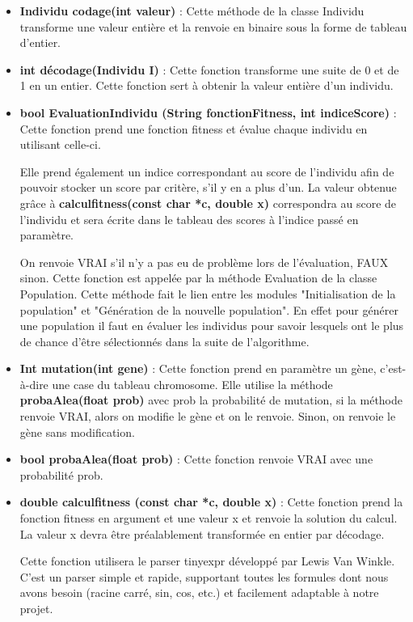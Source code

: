 \documentclass[a4paper,11pt]{article}
\begin{document}
				\begin{itemize}
							\item \textbf{Individu codage(int valeur)} : Cette méthode de la classe Individu transforme une valeur entière et la renvoie en binaire sous la forme de tableau d’entier.\vspace{0.2cm}
							\item \textbf{int décodage(Individu I)} : Cette fonction transforme une suite de 0 et de 1 en un entier. Cette fonction sert à obtenir la valeur entière d’un individu.\vspace{0.2cm}
							\item \textbf{bool EvaluationIndividu (String fonctionFitness, int indiceScore)} : Cette fonction prend une fonction fitness et évalue chaque individu en utilisant celle-ci. 

																									Elle prend également un indice correspondant  au score de l’individu afin de pouvoir stocker un score par critère, s'il y en a plus d'un. 
																									La valeur obtenue grâce à \textbf{calculfitness(const char *c, double x)} correspondra au score de l’individu et sera écrite dans le tableau des scores à l’indice passé en paramètre.

																									On renvoie VRAI s’il n’y a pas eu de problème lors de l’évaluation, FAUX sinon. Cette fonction est appelée par la méthode Evaluation de la classe Population.
																									Cette méthode fait le lien entre les modules "Initialisation de la population" et "Génération de la nouvelle population".
																									En effet pour générer une population il faut en évaluer les individus pour savoir lesquels ont le plus de chance d'être sélectionnés dans la suite de l'algorithme.\vspace{0.2cm}
							\item \textbf{Int mutation(int gene)} : Cette fonction prend en paramètre un gène, c’est-à-dire une case du tableau chromosome.
																		Elle utilise la méthode \textbf{probaAlea(float prob)} avec prob la probabilité de mutation, si la méthode renvoie VRAI, alors on modifie le gène et on le renvoie.
																		Sinon, on renvoie le gène sans modification.\vspace{0.2cm}
							\item \textbf{bool probaAlea(float prob)} : Cette fonction renvoie VRAI avec une probabilité prob.\vspace{0.2cm}

							\item \textbf{double calculfitness (const char *c, double x)} : Cette fonction prend la fonction fitness en argument et une valeur x et renvoie la solution du calcul. La valeur x devra être préalablement transformée en entier par décodage.

								Cette fonction utilisera le parser tinyexpr développé par Lewis Van Winkle. 
								C’est un parser simple et rapide, supportant toutes les formules dont nous avons besoin (racine carré, sin, cos, etc.) et facilement adaptable à notre projet. 
					\end{itemize}
					
\end{document}
